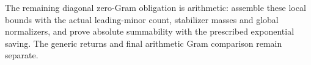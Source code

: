 The remaining diagonal zero-Gram obligation is arithmetic:
assemble these local bounds with the actual leading-minor
count, stabilizer masses and global normalizers, and prove
absolute summability with the prescribed exponential saving.
The generic returns and final arithmetic Gram comparison
remain separate.
